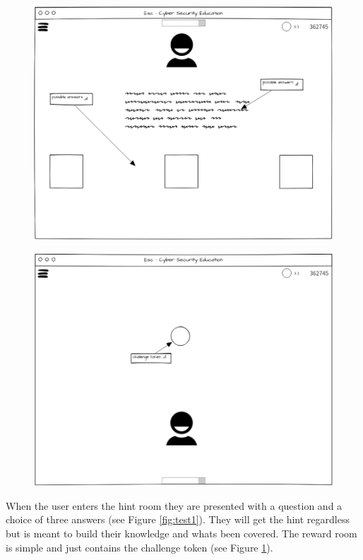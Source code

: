 \documentclass[12pt,a4paper]{article}
\begin{document}
\begin{figure}
\centering
\begin{minipage}{.5\textwidth}
  \centering
  \includegraphics[width=1\linewidth]{Figs/Ui_hint_room.PNG}
  \label{fig:test1}
\end{minipage}%
\begin{minipage}{.5\textwidth}
  \centering
  \includegraphics[width=1\linewidth]{Figs/Ui_reward_room.PNG}
  \label{fig:test2}
\end{minipage}
\end{figure}   

When the user enters the hint room they are presented with a question and a choice of three answers (see Figure \ref{fig:test1}). They will get the hint regardless but is meant to build their knowledge and whats been covered. The reward room is simple and just contains the challenge token (see Figure \ref{fig:test2}). 
\end{document}
